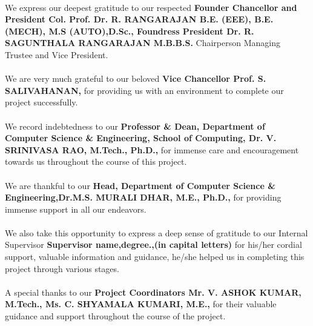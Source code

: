 \documentclass[10pt]{report}
\begin{document}
\linespread{1.13}
\large{\paragraph{}We express our deepest gratitude to our respected \textbf{Founder Chancellor and
President Col. Prof. Dr. R. RANGARAJAN B.E. (EEE), B.E. (MECH), M.S (AUTO),D.Sc., Foundress President
Dr. R. SAGUNTHALA RANGARAJAN M.B.B.S.} Chairperson Managing Trustee and Vice President.}
\large{\paragraph{}We are very much grateful to our beloved \textbf{Vice Chancellor Prof. S.
SALIVAHANAN,} for providing us with an environment to complete our project successfully.}
\large{\paragraph{}We record indebtedness to our \textbf{Professor \& Dean, Department of Computer
Science \& Engineering, School of Computing, Dr. V. SRINIVASA RAO, M.Tech., Ph.D.,} for immense care and encouragement
towards us throughout the course of this project.}

\large{\paragraph{}We are thankful to our \textbf{Head, Department of Computer
Science \& Engineering,Dr.M.S. MURALI DHAR, M.E., Ph.D.,} for providing immense support in all our endeavors.}
\large{\paragraph{}We also take this opportunity to express a deep sense of gratitude to our Internal
Supervisor \textbf{Supervisor name,degree.,(in capital letters)} for his/her cordial support, valuable
information and guidance, he/she helped us in completing this project through various stages. }
\large{\paragraph{}A special thanks to our \textbf{Project Coordinators Mr. V. ASHOK KUMAR, M.Tech., Ms. C. SHYAMALA KUMARI, M.E.,} for their valuable guidance and support throughout the course of the project.}
\end{document}
